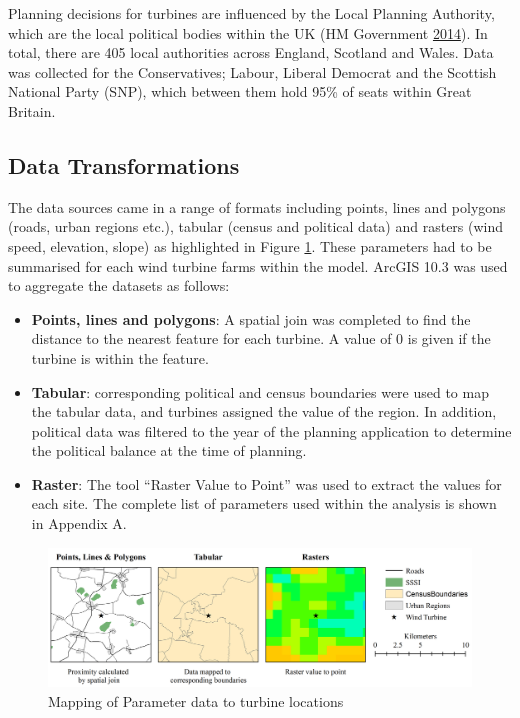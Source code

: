 \documentclass[a4paper,]{article}
\providecommand{\tightlist}{%
  \setlength{\itemsep}{0pt}\setlength{\parskip}{0pt}}
\theoremstyle{definition}
\theoremstyle{definition}
\theoremstyle{remark}
\begin{document}
{Planning decisions for turbines are influenced by the Local Planning
Authority, which are the local political bodies within the UK (HM
Government \protect\hyperlink{ref-HMGovernment2014}{2014}). In total,
there are 405 local authorities across England, Scotland and Wales. Data
was collected for the Conservatives; Labour, Liberal Democrat and the
Scottish National Party (SNP), which between them hold 95\% of seats
within Great Britain.

\subsection{Data Transformations}\label{data-transformations}

The data sources came in a range of formats including points, lines and
polygons (roads, urban regions etc.), tabular (census and political
data) and rasters (wind speed, elevation, slope) as highlighted in
Figure \ref{fig:MappingParameters}. These parameters had to be
summarised for each wind turbine farms within the model. ArcGIS 10.3 was
used to aggregate the datasets as follows:

\begin{itemize}
\tightlist
\item
  \textbf{Points, lines and polygons}: A spatial join was completed to
  find the distance to the nearest feature for each turbine. A value of
  0 is given if the turbine is within the feature.
\item
  \textbf{Tabular}: corresponding political and census boundaries were
  used to map the tabular data, and turbines assigned the value of the
  region. In addition, political data was filtered to the year of the
  planning application to determine the political balance at the time of
  planning.
\item
  \textbf{Raster}: The tool ``Raster Value to Point'' was used to
  extract the values for each site. The complete list of parameters used
  within the analysis is shown in Appendix A.
\end{itemize}

\begin{figure}
\includegraphics[width=1\linewidth]{figures/MappingParameters} \caption{Mapping of Parameter data to turbine locations}\label{fig:MappingParameters}
\end{figure}

}
\end{document}

